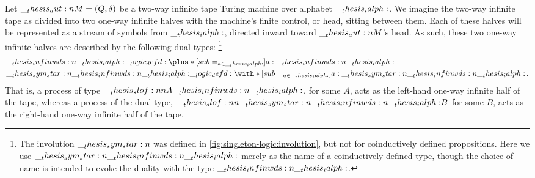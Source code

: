 Let $\__thesis_aut:n {M} = (Q, \delta)$ be a two-way infinite tape Turing machine over alphabet $\__thesis_ialph:$.
We imagine the two-way infinite tape as divided into two one-way infinite halves with the machine's finite control, or head, sitting between them.
Each of these halves will be represented as a stream of symbols from $\__thesis_ialph:$, directed inward toward $\__thesis_aut:n {M}$'s head.
As such, these two one-way infinite halves are described by the following dual types:%
\footnote{The involution $\sym*{}$ was defined in \cref{fig:singleton-logic:involution}, but not for coinductively defined propositions.
  Here we use $\sym*{\infinwds{\ialph}}$ merely as the name of a coinductively defined type, though the choice of name is intended to evoke the duality with the type $\__thesis_infinwds:n {\__thesis_ialph:}$.}%
\begin{equation*}
  \begin{lgathered}
    \infinwds{\ialph} \defd \plus*[sub=_{a \in \ialph}]{ a: \infinwds{\ialph} } \\
    \sym*{\infinwds{\ialph}} \defd \with*[sub=_{a \in \ialph}]{ a : \sym*{\infinwds{\ialph}} }
  \,.
  \end{lgathered}
\end{equation*}
That is, a process of type $\slof{ A |- \infinwds{\ialph} }$, for some $A$, acts as the left-hand one-way infinite half of the tape, whereas a process of the dual type, $\slof{ \sym*{\infinwds{\ialph}} |- B }$ for some $B$, acts as the right-hand one-way infinite half of the tape.

